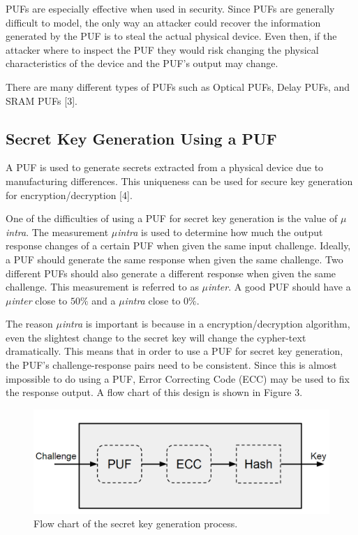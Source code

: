 \documentclass[letterpaper, 10 pt, conference]{ieeeconf}  %
\begin{document}
PUFs are especially effective when used in security.  Since PUFs are generally difficult to model, the only way an attacker could recover the information generated by the PUF is to steal the actual physical device.  Even then, if the attacker where to inspect the PUF they would risk changing the physical characteristics of the device and the PUF's output may change.

There are many different types of PUFs such as Optical PUFs, Delay PUFs, and SRAM PUFs [3].

\subsection{Secret Key Generation Using a PUF}

A PUF is used to generate secrets extracted from a physical device due to manufacturing differences. This uniqueness can be used for secure key generation for encryption/decryption [4].

One of the difficulties of using a PUF for secret key generation is the value of \emph{$\mu$intra}.  The measurement \emph{$\mu$intra} is used to determine how much the output response changes of a certain PUF when given the same input challenge.  Ideally, a PUF should generate the same response when given the same challenge.  Two different PUFs should also generate a different response when given the same challenge.  This measurement is referred to as \emph{$\mu$inter}.  A good PUF should have a \emph{$\mu$inter} close to $50\%$ and a \emph{$\mu$intra} close to $0\%$.

The reason \emph{$\mu$intra} is important is because in a encryption/decryption algorithm, even the slightest change to the secret key will change the cypher-text dramatically.  This means that in order to use a PUF for secret key generation, the PUF's challenge-response pairs need to be consistent.  Since this is almost impossible to do using a PUF, Error Correcting Code (ECC) may be used to fix the response output.  A flow chart of this design is shown in Figure 3.

\begin{figure}[thpb]
	\centering
	\includegraphics[scale=.25]{keyGen}
   \caption{Flow chart of the secret key generation process.}
\end{figure}
\end{document}
